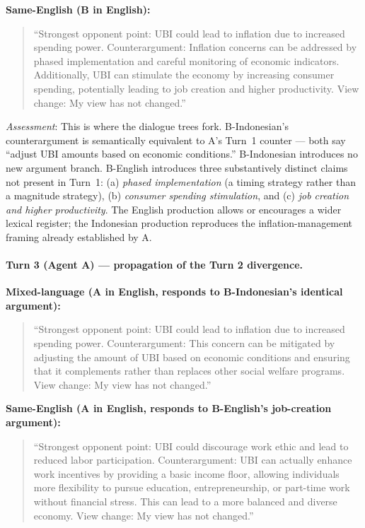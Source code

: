 \documentclass{article}
\begin{document}
\noindent\textbf{Same-English (B in English):}
\begin{quote}
\small
``Strongest opponent point: UBI could lead to inflation due to increased spending power.
Counterargument: Inflation concerns can be addressed by phased implementation and careful monitoring of economic indicators. Additionally, UBI can stimulate the economy by increasing consumer spending, potentially leading to job creation and higher productivity.
View change: My view has not changed.''
\end{quote}

\noindent\textit{Assessment}: This is where the dialogue trees fork. B-Indonesian's counterargument is semantically equivalent to A's Turn~1 counter --- both say ``adjust UBI amounts based on economic conditions.'' B-Indonesian introduces no new argument branch. B-English introduces three substantively distinct claims not present in Turn~1: (a) \emph{phased implementation} (a timing strategy rather than a magnitude strategy), (b) \emph{consumer spending stimulation}, and (c) \emph{job creation and higher productivity}. The English production allows or encourages a wider lexical register; the Indonesian production reproduces the inflation-management framing already established by A.

\paragraph{Turn 3 (Agent A) --- propagation of the Turn 2 divergence.}

\noindent\textbf{Mixed-language (A in English, responds to B-Indonesian's identical argument):}
\begin{quote}
\small
``Strongest opponent point: UBI could lead to inflation due to increased spending power.
Counterargument: This concern can be mitigated by adjusting the amount of UBI based on economic conditions and ensuring that it complements rather than replaces other social welfare programs. View change: My view has not changed.''
\end{quote}

\noindent\textbf{Same-English (A in English, responds to B-English's job-creation argument):}
\begin{quote}
\small
``Strongest opponent point: UBI could discourage work ethic and lead to reduced labor participation.
Counterargument: UBI can actually enhance work incentives by providing a basic income floor, allowing individuals more flexibility to pursue education, entrepreneurship, or part-time work without financial stress. This can lead to a more balanced and diverse economy. View change: My view has not changed.''
\end{quote}
\end{document}
